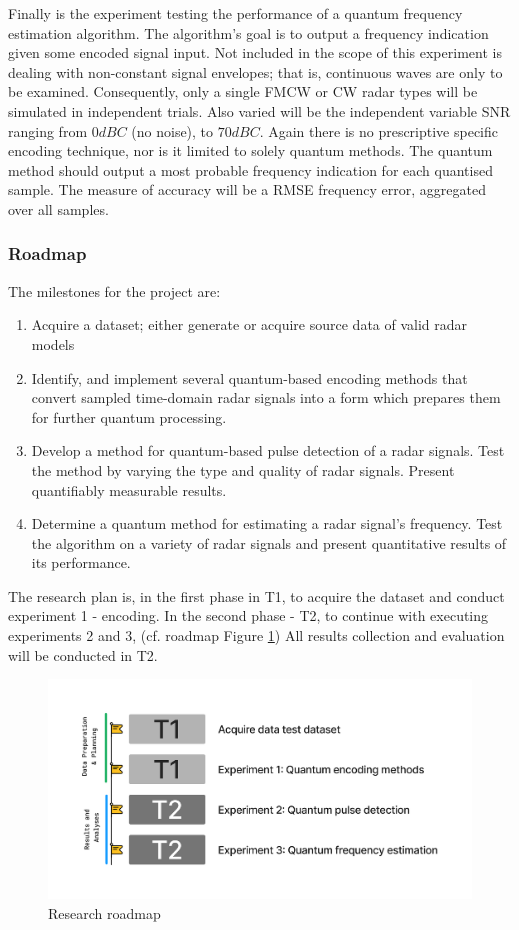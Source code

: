 Finally is the experiment testing the performance of a quantum frequency estimation algorithm.
The algorithm's goal is to output a frequency indication given some encoded signal input.
Not included in the scope of this experiment is dealing with non-constant signal envelopes; that is, continuous waves are only to be examined.
Consequently, only a single \ac{FMCW} or \ac{CW} radar types will be simulated in independent trials.
Also varied will be the independent variable \ac{SNR} ranging from $0dBC$ (no noise), to $70dBC$.
Again there is no prescriptive specific encoding technique, nor is it limited to solely quantum
methods.
The quantum method should output a most probable frequency indication for each quantised sample.
The measure of accuracy will be a \ac{RMSE} frequency error, aggregated over all samples. 


\subsubsection{Roadmap}
The milestones for the project are:
\begin{enumerate}
    \item Acquire a dataset; either generate or acquire source data of valid radar models
    \item Identify, and implement several quantum-based encoding methods that convert sampled time-domain radar signals into a form which prepares them for further quantum processing.
    \item Develop a method for quantum-based pulse detection of a radar signals. Test the method by varying the type and quality of radar signals. Present quantifiably measurable results.
    \item Determine a quantum method for estimating a radar signal’s frequency. Test the algorithm on a variety of radar signals and present quantitative results of its performance.
\end{enumerate}

The research plan is, in the first phase in T1, to acquire the dataset and conduct experiment 1 - encoding.
In the second phase - T2, to continue with executing experiments 2 and 3, (cf. roadmap Figure \ref{fig:roadmap})
All results collection and evaluation will be conducted in T2.

\begin{figure}[ht]
    \centering
    \includegraphics[width=1\textwidth]{Figures/roadmap.png}
    \caption{Research roadmap}
    \label{fig:roadmap}
\end{figure}
